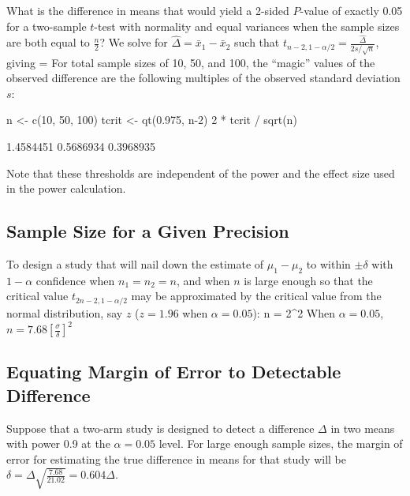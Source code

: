 What is the difference in means that would yield a 2-sided $P$-value
of exactly 0.05 for a two-sample $t$-test with normality and equal
variances when the sample sizes are both equal to $\frac{n}{2}$?  We
solve for $\hat{\Delta} = \bar{x}_{1} - \bar{x}_{2}$ such 
that $t_{n-2,1-\alpha/2} = \frac{\hat{\Delta}}{2s/\sqrt{n}}$, giving
\beq
\hat{\Delta} = 
\eeq
For total sample sizes of 10, 50, and 100, the ``magic'' values of the
observed difference are the following multiples of the observed
standard deviation $s$:
\begin{Schunk}
\begin{Sinput}
n <- c(10, 50, 100)
tcrit <- qt(0.975, n-2)
2 * tcrit / sqrt(n)
\end{Sinput}
\begin{Soutput}
[1] 1.4584451 0.5686934 0.3968935
\end{Soutput}
\end{Schunk}
Note that these thresholds are independent of the power and the effect
size used in the power calculation.


\subsection{Sample Size for a Given Precision}\label{sec:htest-t2-moe}
To design a study that will nail down the estimate of $\mu_{1}-\mu_{2}$
to within $\pm \delta$ with $1-\alpha$ confidence when $n_{1}=n_{2}=n$, and
when $n$ is large enough so that the critical value
$t_{2n-2,1-\alpha/2}$ may be approximated by the critical value from
the normal distribution, say $z$ ($z=1.96$ when $\alpha=0.05$):
\beq
n = 2^{2}
\eeq
When $\alpha=0.05$, $n = 7.68 [\frac{\sigma}{\delta}]^{2}$

\subsection{Equating Margin of Error to Detectable Difference}
Suppose that a two-arm study is designed to detect a difference $\Delta$ in two
means with power 0.9 at the $\alpha=0.05$ level.  For large enough
sample sizes, the margin of error for estimating the true difference
in means for that study will be $\delta =
\Delta\sqrt{\frac{7.68}{21.02}} = 0.604\Delta$.

